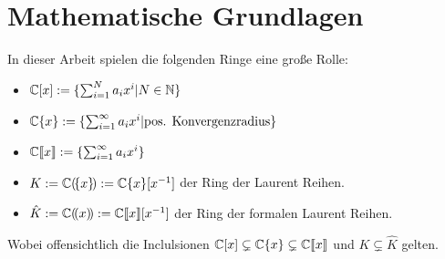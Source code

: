 \chapter{Mathematische Grundlagen}

\begin{comment}
Hier werde ich mich auf \cite{sabbah_cimpa90} und \cite{coutinho1995primer}
beziehen.
\end{comment}

In dieser Arbeit spielen die folgenden Ringe eine große Rolle:
\begin{itemize}
\item $\mathbb{C}[x]:=\{ \sum^{N}_{i=1}a_ix^i | N\in \mathbb{N} \}$
\item $\mathbb{C}\{x\}:=\{ \sum^{\infty}_{i=1}a_ix^i | \mbox{pos.
  Konvergenzradius} \}$
\item $\mathbb{C}\llbracket x\rrbracket:=\{ \sum^{\infty}_{i=1}a_ix^i \}$
\item $K:={\mathbb C (\!\{x\}\!)}:=\mathbb{C}\{x\}[x^{-1}]$ der Ring der Laurent Reihen.
\item $\hat{K}:={\mathbb C (\!(x)\!)}:=\mathbb{C}\llbracket x\rrbracket[x^{-1}]$ der Ring der
formalen Laurent Reihen.
\end{itemize}
Wobei offensichtlich die Inclulsionen $\mathbb{C}[x]\subsetneq\mathbb{C}\{x\}\subsetneq{\mathbb C\llbracket x\rrbracket}$ und
$K\subsetneq\hat K$ gelten.

\begin{comment}
Es bezeichnet der Hut ($ \, \hat \,\, $) das jeweils formale äquivalent zu
einem konvergentem Objekt.
\end{comment}

\begin{comment}
\begin{lem}[Seite 2]
ein paar eigenschaften
\begin{enumerate}
\item $\C[x]$ ist ein graduierter Ring, durch die Grad der
Polynome. Diese graduierung induziert eine aufsteigende Filtrierung.

alle Ideale haben die form $(x-a)$ mit $a\in \C$
\item wenn $\mathfrak{m}$ das maximale Ideal von $\C[x]$ (erzeugt von
$x$ ist), so ist
\[
  \C[[x]]=
  \underset{k}{\underleftarrow{\lim}} \C[X]\backslash\mathfrak{m}^k
\]
The ring $\C[[x]]$ ist ein nöterscher lokaler Ring:
jede Potenzreihe mit konstantem term $\neq 0$ ist invertierbar.

Der ring ist ebenfalls ein diskreter ??? Ring (discrete valuation
ring)

Die Filtrierung nach grad des Maximalen Ideals, genannt
$\mathfrak{m}$-adische Fitration, ist die Filtrierung
$\mathfrak{m}^k=\{f\in \C[[x]]|v(f)\geq k\}$

und es gilt $gr_\mathfrak{m}(\C[[x]])=\C[x]$
\end{enumerate}
\end{lem}
\end{comment}

